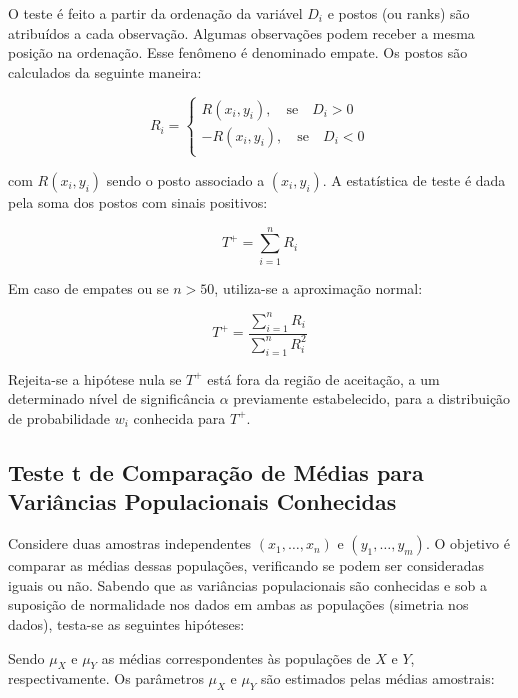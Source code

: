 \documentclass[
]{estat/estat}
\begin{document}

O teste é feito a partir da ordenação da variável \(D_i\) e postos (ou
ranks) são atribuídos a cada observação. Algumas observações podem
receber a mesma posição na ordenação. Esse fenômeno é denominado empate.
Os postos são calculados da seguinte maneira:

\[R_i =
\begin{cases}
 R(x_i, y_i), \quad \text{se} \quad D_i > 0\\ 
 -R(x_i, y_i), \quad \text{se} \quad D_i < 0\\
\end{cases}\]

com \(R(x_i, y_i)\) sendo o posto associado a \((x_i, y_i)\). A
estatística de teste é dada pela soma dos postos com sinais positivos:

\[T^+ = \displaystyle \sum_{i=1}^{n} R_i\]

Em caso de empates ou se \(n > 50\), utiliza-se a aproximação normal:

\[T^+ = \frac{\displaystyle \sum_{i=1}^{n} R_i}{\displaystyle \sum_{i=1}^{n} R^2_i}\]

Rejeita-se a hipótese nula se \(T^+\) está fora da região de aceitação,
a um determinado nível de significância \(\alpha\) previamente
estabelecido, para a distribuição de probabilidade \(w_i\) conhecida
para \(T^+\).

\hypertarget{teste-t-de-comparauxe7uxe3o-de-muxe9dias-para-variuxe2ncias-populacionais-conhecidas}{%
\subsection{Teste t de Comparação de Médias para Variâncias
Populacionais
Conhecidas}\label{teste-t-de-comparauxe7uxe3o-de-muxe9dias-para-variuxe2ncias-populacionais-conhecidas}}

Considere duas amostras independentes \((x_1, \ldots, x_n)\) e
\((y_1, \ldots, y_m)\). O objetivo é comparar as médias dessas
populações, verificando se podem ser consideradas iguais ou não. Sabendo
que as variâncias populacionais são conhecidas e sob a suposição de
normalidade nos dados em ambas as populações (simetria nos dados),
testa-se as seguintes hipóteses:


Sendo \(\mu_X\) e \(\mu_Y\) as médias correspondentes às populações de
\(X\) e \(Y\), respectivamente. Os parâmetros \(\mu_X\) e \(\mu_Y\) são
estimados pelas médias amostrais:
\end{document}

